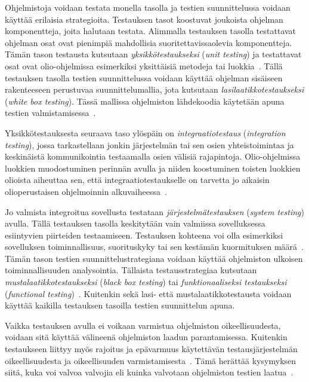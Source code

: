 \documentclass[finnish]{tktltiki2}
\theoremstyle{definition}
\theoremstyle{remark}
\begin{document}
Ohjelmistoja voidaan testata monella tasolla ja testien suunnittelussa voidaan käyttää erilaisia strategioita. Testauksen tasot koostuvat joukoista ohjelman komponentteja, joita halutaan testata. Alimmalla testauksen tasolla testattavat ohjelman osat ovat pienimpiä mahdollisia suoritettavissaolevia komponentteja. Tämän tason testausta kutsutaan \textit{yksikkötestaukseksi} (\textit{unit testing}) ja testattavat osat ovat olio-ohjelmissa esimerkiksi yksittäisiä metodeja tai luokkia~\cite[s. 45]{Binder:1999}. Tällä testauksen tasolla testien suunnittelussa voidaan käyttää ohjelman sisäiseen rakenteeseen perustuvaa suunnittelumallia, jota kutsutaan \textit{lasilaatikkotestaukseksi} (\textit{white box testing}). Tässä mallissa ohjelmiston lähdekoodia käytetään apuna testien valmistamisessa~\cite[s. 52]{Binder:1999}.

Yksikkötestauksesta seuraava taso ylöspäin on \textit{integraatiotestaus} (\textit{integration testing}), jossa tarkastellaan jonkin järjestelmän tai sen osien yhteistoimintaa ja keskinäistä kommunikointia testaamalla osien välisiä rajapintoja. Olio-ohjelmissa luokkien muodostuminen perinnän avulla ja niiden koostuminen toisten luokkien olioista aiheuttaa sen, että integraatiotestaukselle on tarvetta jo aikaisin olioperustaisen ohjelmoinnin alkuvaiheessa~\cite[s. 45]{Binder:1999}.

Jo valmista integroitua sovellusta testataan \textit{järjestelmätestauksen} (\textit{system testing}) avulla. Tällä testauksen tasolla keskitytään vain valmiissa sovelluksessa esiintyvien piirteiden testaamiseen. Testauksen kohteena voi olla esimerkiksi sovelluksen toiminnallisuus, suorituskyky tai sen kestämän kuormituksen määrä~\cite[s. 45]{Binder:1999}. Tämän tason testien suunnittelustrategiana voidaan käyttää ohjelmiston ulkoisen toiminnallisuuden analysointia. Tällaista testausstrategiaa kutsutaan \textit{mustalaatikkotestaukseksi} (\textit{black box testing}) tai \textit{funktionaaliseksi testaukseksi} (\textit{functional testing})~\cite[s. 52]{Binder:1999}. Kuitenkin sekä lasi- että mustalaatikkotestausta voidaan käyttää kaikilla testauksen tasoilla testien suunnittelun apuna. 

Vaikka testauksen avulla ei voikaan varmistua ohjelmiston oikeellisuudesta, voidaan sitä käyttää välineenä ohjelmiston laadun parantamisessa. Kuitenkin testaukseen liittyy myös rajoitus ja epävarmuus käytettävän testausjärjestelmän oikeellisuudesta ja oikeellisuuden varmistamisesta~\cite{Manna:Waldinger:1978}. Tämä herättää kysymyksen siitä, kuka voi valvoa valvojia eli kuinka valvotaan ohjelmiston testien laatua~\cite{JOTAKINTÄHÄN}.
\end{document}
